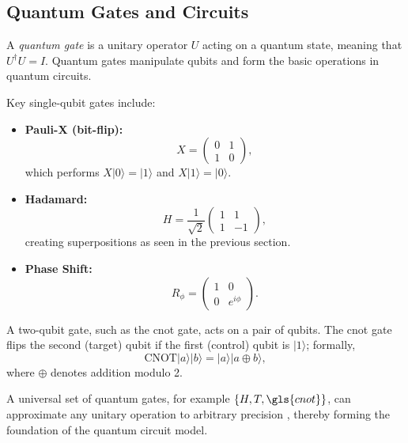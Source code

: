 
\subsection{Quantum Gates and Circuits}
\label{subsec:gates}

\begin{definition}
A \emph{quantum gate} is a unitary operator \(U\) acting on a quantum state, meaning that \(U^\dagger U = I\). Quantum gates manipulate \glspl{qubit} and form the basic operations in quantum circuits.
\end{definition}

\begin{notation}
Key single-qubit gates include:
\begin{itemize}
    \item \textbf{Pauli-X (bit-flip):}
    \[
    X = \begin{pmatrix} 0 & 1 \\ 1 & 0 \end{pmatrix},
    \]
    which performs \(X|0\rangle = |1\rangle\) and \(X|1\rangle = |0\rangle\).
    \item \textbf{Hadamard:}
    \[
    H = \frac{1}{\sqrt{2}}\begin{pmatrix} 1 & 1 \\ 1 & -1 \end{pmatrix},
    \]
    creating superpositions as seen in the previous section.
    \item \textbf{Phase Shift:}
    \[
    R_\phi = \begin{pmatrix} 1 & 0 \\ 0 & e^{i\phi} \end{pmatrix}.
    \]
\end{itemize}
\end{notation}

\begin{definition}
A two-qubit gate, such as the \gls{cnot} gate, acts on a pair of qubits. The \gls{cnot} gate flips the second (target) qubit if the first (control) qubit is \(|1\rangle\); formally,
\[
\text{CNOT}|a\rangle|b\rangle = |a\rangle|a \oplus b\rangle,
\]
where \(\oplus\) denotes addition modulo 2.
\end{definition}

\begin{remark}
    A universal set of quantum gates, for example \(\{H, T, \gls{cnot}\}\), can approximate any unitary operation to arbitrary precision \cite{nielsen2010quantum}, thereby forming the foundation of the quantum circuit model.
\end{remark}


